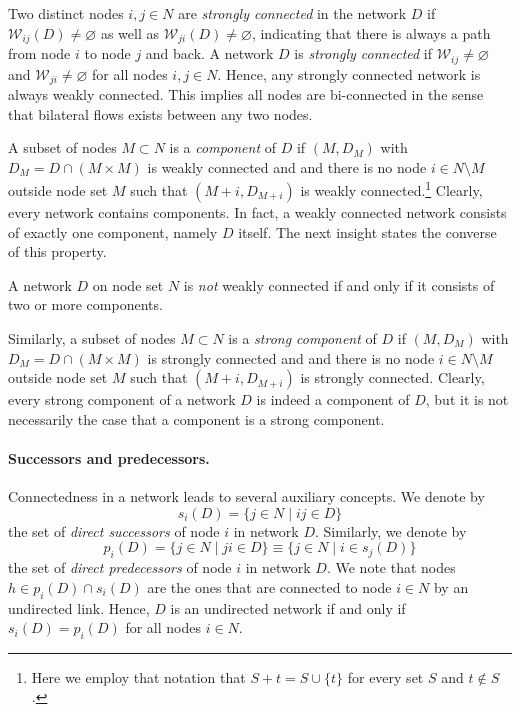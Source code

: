 Two distinct nodes $i,j \in N$ are \textit{strongly connected} in the network $D$ if $\mathcal{W}_{ij}(D) \neq \varnothing$ as well as $\mathcal{W}_{ji}(D) \neq \varnothing$, indicating that there is always a path from node $i$ to node $j$ and back. A network $D$ is \emph{strongly connected} if $\mathcal{W}_{ij} \neq \varnothing$ and $\mathcal{W}_{ji} \neq \varnothing$ for all nodes $i,j \in N$. Hence, any strongly connected network is always weakly connected. This implies all nodes are bi-connected in the sense that bilateral flows exists between any two nodes.

A subset of nodes $M \subset N$ is a \emph{component} of $D$ if $(M, D_M)$ with $D_M = D \cap (M \times M)$ is weakly connected and and there is no node $i \in N \setminus M$ outside node set $M$ such that $(M+i, D_{M+i})$ is weakly connected.\footnote{Here we employ that notation that $S+t = S \cup \{ t \}$ for every set $S$ and $t \notin S$.} Clearly, every network contains components. In fact, a weakly connected network consists of exactly one component, namely $D$ itself. The next insight states the converse of this property.
\begin{lemma}
	A network $D$ on node set $N$ is \emph{not} weakly connected if and only if it consists of two or more components.
\end{lemma}

\noindent
Similarly, a subset of nodes $M \subset N$ is a \emph{strong component} of $D$ if $(M, D_M)$ with $D_M = D \cap (M \times M)$ is strongly connected and and there is no node $i \in N \setminus M$ outside node set $M$ such that $(M+i, D_{M+i})$ is strongly connected. Clearly, every strong component of a network $D$ is indeed a component of $D$, but it is not necessarily the case that a component is a strong component.

\paragraph{Successors and predecessors.}

Connectedness in a network leads to several auxiliary concepts. We denote by
\begin{equation}
	s_i (D) = \{ j \in N \mid ij \in D \}
\end{equation}
the set of \emph{direct successors} of node $i$ in network $D$. Similarly, we denote by
\begin{equation}
	p_i (D) = \{ j \in N \mid ji \in D \} \equiv \{ j \in N \mid i \in s_j (D) \}
\end{equation}
the set of \emph{direct predecessors} of node $i$ in network $D$. We note that nodes $h \in p_i (D) \cap s_i (D)$ are the ones that are connected to node $i \in N$ by an undirected link. Hence, $D$ is an undirected network if and only if $s_i (D) = p_i (D)$ for all nodes $i \in N$.

